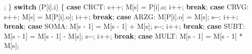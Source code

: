 \documentclass[
  brazilian,
  letterpaper,
]{book}
\newenvironment{Shaded}{\begin{snugshade}}{\end{snugshade}}
\newcommand{\ControlFlowTok}[1]{\textcolor[rgb]{0.00,0.23,0.31}{\textbf{#1}}}
\newcommand{\DecValTok}[1]{\textcolor[rgb]{0.68,0.00,0.00}{#1}}
\newcommand{\NormalTok}[1]{\textcolor[rgb]{0.00,0.23,0.31}{#1}}
\newcommand{\OperatorTok}[1]{\textcolor[rgb]{0.37,0.37,0.37}{#1}}
\theoremstyle{plain}
\theoremstyle{definition}
\theoremstyle{remark}
\begin{document}
\begin{Shaded}
\begin{Highlighting}[]
                \OperatorTok{;}
        \OperatorTok{\}}
        \ControlFlowTok{switch} \OperatorTok{(}\NormalTok{P}\OperatorTok{[}\NormalTok{i}\OperatorTok{].}\NormalTok{i}\OperatorTok{)}
        \OperatorTok{\{}
        \ControlFlowTok{case}\NormalTok{ CRCT}\OperatorTok{:}
\NormalTok{            s}\OperatorTok{++;}
\NormalTok{            M}\OperatorTok{[}\NormalTok{s}\OperatorTok{]} \OperatorTok{=}\NormalTok{ P}\OperatorTok{[}\NormalTok{i}\OperatorTok{].}\NormalTok{o}\OperatorTok{;}
\NormalTok{            i}\OperatorTok{++;}
            \ControlFlowTok{break}\OperatorTok{;}
        \ControlFlowTok{case}\NormalTok{ CRVG}\OperatorTok{:}
\NormalTok{            s}\OperatorTok{++;}
\NormalTok{            M}\OperatorTok{[}\NormalTok{s}\OperatorTok{]} \OperatorTok{=}\NormalTok{ M}\OperatorTok{[}\NormalTok{P}\OperatorTok{[}\NormalTok{i}\OperatorTok{].}\NormalTok{o}\OperatorTok{];}
\NormalTok{            i}\OperatorTok{++;}
            \ControlFlowTok{break}\OperatorTok{;}
        \ControlFlowTok{case}\NormalTok{ ARZG}\OperatorTok{:}
\NormalTok{            M}\OperatorTok{[}\NormalTok{P}\OperatorTok{[}\NormalTok{i}\OperatorTok{].}\NormalTok{o}\OperatorTok{]} \OperatorTok{=}\NormalTok{ M}\OperatorTok{[}\NormalTok{s}\OperatorTok{];}
\NormalTok{            s}\OperatorTok{{-}{-};}
\NormalTok{            i}\OperatorTok{++;}
            \ControlFlowTok{break}\OperatorTok{;}
        \ControlFlowTok{case}\NormalTok{ SOMA}\OperatorTok{:}
\NormalTok{            M}\OperatorTok{[}\NormalTok{s }\OperatorTok{{-}} \DecValTok{1}\OperatorTok{]} \OperatorTok{=}\NormalTok{ M}\OperatorTok{[}\NormalTok{s }\OperatorTok{{-}} \DecValTok{1}\OperatorTok{]} \OperatorTok{+}\NormalTok{ M}\OperatorTok{[}\NormalTok{s}\OperatorTok{];}
\NormalTok{            s}\OperatorTok{{-}{-};}
\NormalTok{            i}\OperatorTok{++;}
            \ControlFlowTok{break}\OperatorTok{;}
        \ControlFlowTok{case}\NormalTok{ SUBT}\OperatorTok{:}
\NormalTok{            M}\OperatorTok{[}\NormalTok{s }\OperatorTok{{-}} \DecValTok{1}\OperatorTok{]} \OperatorTok{=}\NormalTok{ M}\OperatorTok{[}\NormalTok{s }\OperatorTok{{-}} \DecValTok{1}\OperatorTok{]} \OperatorTok{{-}}\NormalTok{ M}\OperatorTok{[}\NormalTok{s}\OperatorTok{];}
\NormalTok{            s}\OperatorTok{{-}{-};}
\NormalTok{            i}\OperatorTok{++;}
            \ControlFlowTok{break}\OperatorTok{;}
        \ControlFlowTok{case}\NormalTok{ MULT}\OperatorTok{:}
\NormalTok{            M}\OperatorTok{[}\NormalTok{s }\OperatorTok{{-}} \DecValTok{1}\OperatorTok{]} \OperatorTok{=}\NormalTok{ M}\OperatorTok{[}\NormalTok{s }\OperatorTok{{-}} \DecValTok{1}\OperatorTok{]} \OperatorTok{*}\NormalTok{ M}\OperatorTok{[}\NormalTok{s}\OperatorTok{];}

\end{Highlighting}
\end{Shaded}
\end{document}
